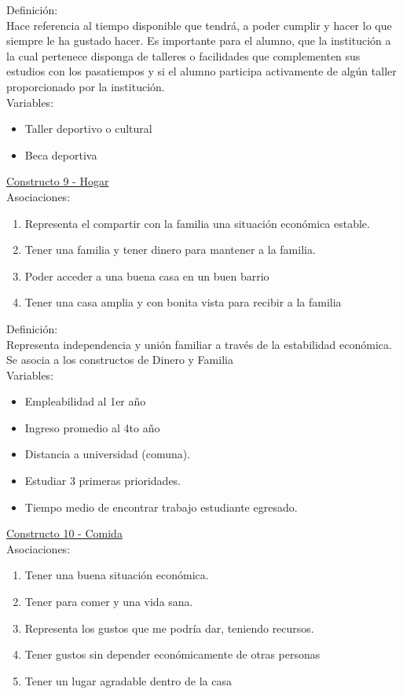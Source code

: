 Definición:\\
Hace referencia al tiempo disponible que tendrá, a poder cumplir y hacer lo que siempre le ha gustado hacer. Es importante para el alumno, que la institución a la cual pertenece disponga de talleres o facilidades que complementen sus estudios con los pasatiempos y si el alumno participa activamente de algún taller proporcionado por la institución.\\


Variables:\\
\begin{itemize}
	\item Taller deportivo o cultural 
	\item Beca deportiva
\end{itemize}


\underline {Constructo 9 - Hogar} \\
Asociaciones:
\begin{enumerate}
	\item Representa el compartir con la familia una situación económica estable.
	\item Tener una familia y tener dinero para mantener a la familia.
	\item Poder acceder a una buena casa en un buen barrio
	\item Tener una casa amplia y con bonita vista para recibir a la familia	
\end{enumerate}

Definición:\\
Representa independencia y unión familiar a través de la estabilidad económica. Se asocia a los constructos de Dinero y Familia\\

Variables:\\
\begin{itemize}
	\item Empleabilidad al 1er año
	\item Ingreso promedio al 4to año
	\item Distancia a universidad (comuna).
	\item Estudiar 3 primeras prioridades.
	\item Tiempo medio de encontrar trabajo estudiante egresado.	
\end{itemize} 

\underline {Constructo 10 - Comida} \\
Asociaciones:
\begin{enumerate}
	\item Tener una buena situación económica.
	\item Tener para comer y una vida sana.
	\item Representa los gustos que me podría dar, teniendo recursos.	
	\item Tener gustos sin depender económicamente de otras personas
	\item Tener un lugar agradable dentro de la casa
\end{enumerate}

